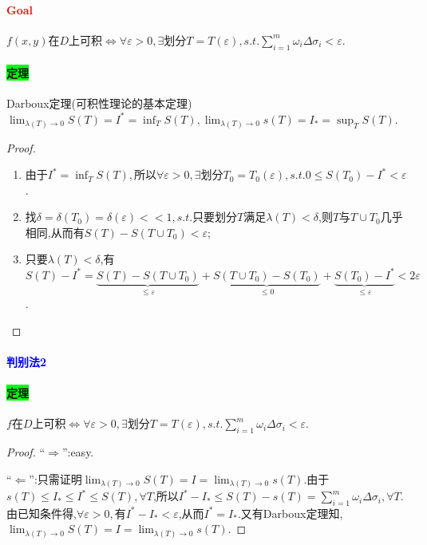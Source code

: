 \documentclass[UTF8]{ctexart}
\begin{document}
    \paragraph{\textcolor{red}{Goal}}$f(x,y)$在$D$上可积$\Leftrightarrow\forall\varepsilon>0,\exists$划分$T=T(\varepsilon),s.t.\sum_{i=1}^m\omega_i\Delta\sigma_i<\varepsilon$.
    \paragraph{\colorbox{lime}{定理}}Darboux定理(可积性理论的基本定理) $\lim_{\lambda(T)\to0}S(T)=I^*=\inf_TS(T),\lim_{\lambda(T)\to0}s(T)=I_*=\sup_TS(T)$.
    \begin{proof}
        \begin{enumerate}[{Step }1]
            \item 由于$I^*=\inf_TS(T),$所以$\forall\varepsilon>0,\exists$划分$T_0=T_0(\varepsilon),s.t.0\le S(T_0)-I^*<\varepsilon$.
            \item 找$\delta=\delta(T_0)=\delta(\varepsilon)<<1,s.t.$只要划分$T$满足$\lambda(T)<\delta$,则$T$与$T\cup T_0$几乎相同,从而有$S(T)-S(T\cup T_0)<\varepsilon$;
            \item 只要$\lambda(T)<\delta$,有$S(T)-I^*=\underbrace{S(T)-S(T\cup T_0)}_{\le\varepsilon}+\underbrace{S(T\cup T_0)-S(T_0)}_{\le 0}+\underbrace{S(T_0)-I^*}_{\le\varepsilon}<2\varepsilon$.
        \end{enumerate}
    \end{proof}

    \paragraph{\textcolor{blue}{判别法2}}
    \paragraph{\colorbox{lime}{定理}}$f$在$D$上可积$\Leftrightarrow\forall\varepsilon>0,\exists$划分$T=T(\varepsilon),s.t.\sum_{i=1}^m\omega_i\Delta\sigma_i<\varepsilon$.
    \begin{proof}
        ``$\Rightarrow$'':easy.

        ``$\Leftarrow$'':只需证明$\lim_{\lambda(T)\to0}S(T)=I=\lim_{\lambda(T)\to0}s(T)$.由于$s(T)\le I_*\le I^*\le S(T),\forall T$,所以$I^*-I_*\le S(T)-s(T)=\sum_{i=1}^m\omega_i\Delta\sigma_i,\forall T$.由已知条件得,$\forall\varepsilon>0,$有$I^*-I_*<\varepsilon$,从而$I^*=I_*$.又有Darboux定理知,$\lim_{\lambda(T)\to0}S(T)=I=\lim_{\lambda(T)\to0}s(T)$.
    \end{proof}
\end{document}
